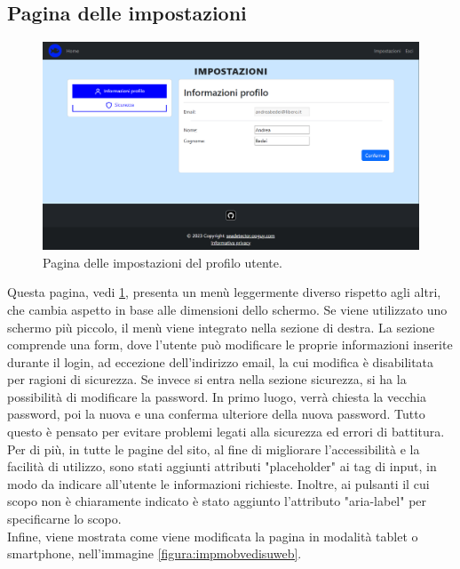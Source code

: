 \documentclass[a4paper,final,12pt]{report}
\begin{document}
\subsection{Pagina delle impostazioni}
\begin{figure}[hbtp]
\centering
\includegraphics[scale=0.36]{img_concettuale/impostazioniPG.png}
\caption{Pagina delle impostazioni del profilo utente.}
\label{figura:pagdelleimpostazioniweb}
\end{figure}
Questa pagina, vedi \ref{figura:pagdelleimpostazioniweb}, presenta un menù leggermente diverso rispetto agli altri, che cambia aspetto in base alle dimensioni dello schermo. Se viene utilizzato uno schermo più piccolo, il menù viene integrato nella sezione di destra. La sezione comprende una form, dove l'utente può modificare le proprie informazioni inserite durante il login, ad eccezione dell'indirizzo email, la cui modifica è disabilitata per ragioni di sicurezza.
Se invece si entra nella sezione sicurezza, si ha la possibilità di modificare la password. In primo luogo, verrà chiesta la vecchia password, poi la nuova e una conferma ulteriore della nuova password. Tutto questo è pensato per evitare problemi legati alla sicurezza ed errori di battitura.\\
Per di più, in tutte le pagine del sito, al fine di migliorare l'accessibilità e la facilità di utilizzo, sono stati aggiunti attributi "placeholder" ai tag di input, in modo da indicare all'utente le informazioni richieste. Inoltre, ai pulsanti il cui scopo non è chiaramente indicato è stato aggiunto l'attributo "aria-label" per specificarne lo scopo.\\ Infine, viene mostrata come viene modificata la pagina in modalità tablet o smartphone, nell'immagine \ref{figura:impmobvedisuweb}.
\end{document}
